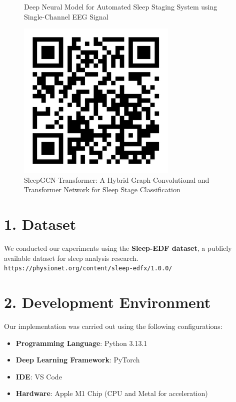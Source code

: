 \begin{figure}[h!]
\begin{minipage}[b]{0.3\linewidth}
		\caption{Deep Neural Model for Automated Sleep Staging System using Single-Channel EEG Signal}
		\label{fig:paper1}
	\end{minipage}\hfill
	\begin{minipage}[b]{0.3\linewidth}
		\centering
		\includegraphics[width=\linewidth]{img/paper2}
		\caption{SleepGCN-Transformer: A Hybrid Graph-Convolutional and Transformer Network for Sleep Stage Classification}
		\label{fig:paper2}
	\end{minipage}
\end{figure}

\section{1. Dataset}
We conducted our experiments using the \textbf{Sleep-EDF dataset}, a publicly available dataset for sleep analysis research.\\
\texttt{https://physionet.org/content/sleep-edfx/1.0.0/}

\section{2. Development Environment}
Our implementation was carried out using the following configurations:
\begin{itemize}
	\item \textbf{Programming Language}: Python 3.13.1
	\item \textbf{Deep Learning Framework}: PyTorch
	\item \textbf{IDE}: VS Code
	\item \textbf{Hardware}: Apple M1 Chip (CPU and Metal for acceleration)
\end{itemize}


